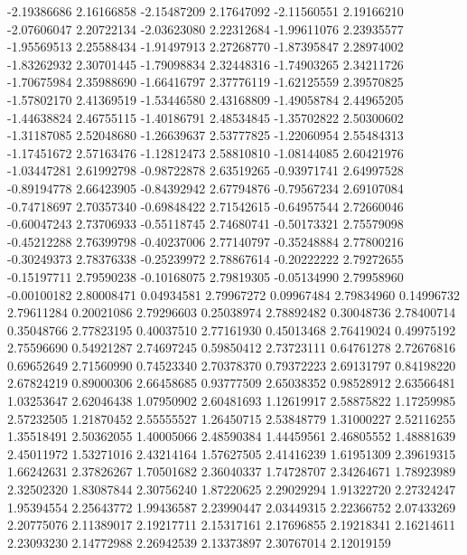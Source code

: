 -2.19386686  2.16166858  
-2.15487209  2.17647092  
-2.11560551  2.19166210  
-2.07606047  2.20722134  
-2.03623080  2.22312684  
-1.99611076  2.23935577  
-1.95569513  2.25588434  
-1.91497913  2.27268770  
-1.87395847  2.28974002  
-1.83262932  2.30701445  
-1.79098834  2.32448316  
-1.74903265  2.34211726  
-1.70675984  2.35988690  
-1.66416797  2.37776119  
-1.62125559  2.39570825  
-1.57802170  2.41369519  
-1.53446580  2.43168809  
-1.49058784  2.44965205  
-1.44638824  2.46755115  
-1.40186791  2.48534845  
-1.35702822  2.50300602  
-1.31187085  2.52048680  
-1.26639637  2.53777825  
-1.22060954  2.55484313  
-1.17451672  2.57163476  
-1.12812473  2.58810810  
-1.08144085  2.60421976  
-1.03447281  2.61992798  
-0.98722878  2.63519265  
-0.93971741  2.64997528  
-0.89194778  2.66423905  
-0.84392942  2.67794876  
-0.79567234  2.69107084  
-0.74718697  2.70357340  
-0.69848422  2.71542615  
-0.64957544  2.72660046  
-0.60047243  2.73706933  
-0.55118745  2.74680741  
-0.50173321  2.75579098  
-0.45212288  2.76399798  
-0.40237006  2.77140797  
-0.35248884  2.77800216  
-0.30249373  2.78376338  
-0.25239972  2.78867614  
-0.20222222  2.79272655  
-0.15197711  2.79590238  
-0.10168075  2.79819305  
-0.05134990  2.79958960  
-0.00100182  2.80008471  
0.04934581   2.79967272  
0.09967484   2.79834960  
0.14996732   2.79611284  
0.20021086   2.79296603  
0.25038974   2.78892482  
0.30048736   2.78400714  
0.35048766   2.77823195  
0.40037510   2.77161930  
0.45013468   2.76419024  
0.49975192   2.75596690  
0.54921287   2.74697245  
0.59850412   2.73723111  
0.64761278   2.72676816  
0.69652649   2.71560990  
0.74523340   2.70378370  
0.79372223   2.69131797  
0.84198220   2.67824219  
0.89000306   2.66458685  
0.93777509   2.65038352  
0.98528912   2.63566481  
1.03253647   2.62046438  
1.07950902   2.60481693  
1.12619917   2.58875822  
1.17259985   2.57232505  
1.21870452   2.55555527  
1.26450715   2.53848779  
1.31000227   2.52116255  
1.35518491   2.50362055  
1.40005066   2.48590384  
1.44459561   2.46805552  
1.48881639   2.45011972  
1.53271016   2.43214164  
1.57627505   2.41416239  
1.61951309   2.39619315  
1.66242631   2.37826267  
1.70501682   2.36040337  
1.74728707   2.34264671  
1.78923989   2.32502320  
1.83087844   2.30756240  
1.87220625   2.29029294  
1.91322720   2.27324247  
1.95394554   2.25643772  
1.99436587   2.23990447  
2.03449315   2.22366752  
2.07433269   2.20775076  
2.11389017   2.19217711  
2.15317161   2.17696855  
2.19218341   2.16214611  
2.23093230   2.14772988  
2.26942539   2.13373897  
2.30767014   2.12019159  
